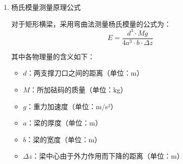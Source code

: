 \documentclass[11pt]{article}
\begin{document}
\begin{enumerate}
由于梁的弯曲很小，有
\begin{equation}\label{2-2}
    R(x)=\frac{1}{y''(x)}
\end{equation}

平衡时，梁在$x$处的转矩为
\begin{equation}\label{2-3}
    \mu(x)=\frac{Mg}{2}\left(\frac{d}{2}-x\right)
\end{equation}

由(\ref{2-1})、(\ref{2-2})、(\ref{2-3})联立求解，代入边界条件$y(0)=0$，$y'(0)=0$，得
\begin{equation}
y(x)=\frac{3Mg}{Yba^3}\left(\frac{d}{2}x^2-\frac{1}{3}x^3\right)
\end{equation}

在中点$x=\frac{d}{2}$处，有
\begin{equation}
\Delta z=y\left(\frac{d}{2}\right)=\frac{Mgd^3}{4Yba^3}
\end{equation}

因此杨氏模量为
\begin{equation}\label{2}
    Y=\frac{d^3Mg}{4a^3b\Delta Z}
\end{equation}

其中$d$为两刀口间距离，$M$为所加质量，$a$为梁的厚度，$b$为梁的宽度，$\Delta Z$为梁中心下降距离，$g$为重力加速度。

 \item 杨氏模量测量原理公式 \par
对于矩形横梁，采用弯曲法测量杨氏模量的公式为：
\begin{equation}
E = \frac{d^3 \cdot M g}{4a^3 \cdot b \cdot \Delta z}
\label{eq:young_modulus}
\end{equation}

其中各物理量的含义如下：
\begin{itemize}
\item $d$：两支撑刀口之间的距离（单位：m）
\item $M$：所加砝码的质量（单位：kg）
\item $g$：重力加速度（单位：m/s²）
\item $a$：梁的厚度（单位：m）
\item $b$：梁的宽度（单位：m）
\item $\Delta z$：梁中心由于外力作用而下降的距离（单位：m）
\end{itemize}
\end{enumerate}
\end{document}
